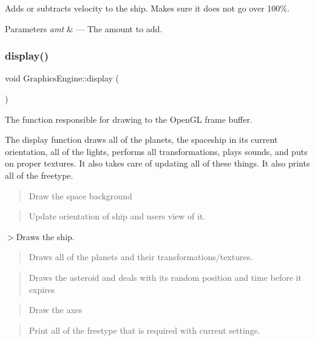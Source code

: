 Adds or subtracts velocity to the ship. Makes sure it does not go over 100\%. 


\begin{DoxyParams}{Parameters}
{\em amt} & --- The amount to add. \\
\hline
\end{DoxyParams}
\mbox{\label{class_graphics_engine_a2f0bdf1a47bf9e8d4f1c9525c2ebc8f9}} 
\subsubsection{\texorpdfstring{display()}{display()}}
{\footnotesize\ttfamily void Graphics\+Engine\+::display (\begin{DoxyParamCaption}{ }\end{DoxyParamCaption})}



The function responsible for drawing to the Open\+GL frame buffer. 

The display function draws all of the planets, the spaceship in it\textquotesingle{}s current orientation, all of the lights, performs all transformations, plays sounds, and puts on proper textures. It also takes care of updating all of these things. It also prints all of the freetype. \begin{quote}
Draw the space background \end{quote}


\begin{quote}
Update orientation of ship and user\textquotesingle{}s view of it. \end{quote}


$>$Draws the ship.

\begin{quote}
Draws all of the planets and their transformations/textures. \end{quote}


\begin{quote}
Draws the asteroid and deals with it\textquotesingle{}s random position and time before it expires \end{quote}


\begin{quote}
Draw the axes \end{quote}


\begin{quote}
Print all of the freetype that is required with current settings. \end{quote}
\mbox{\label{class_graphics_engine_a45375adf56d4769b0f33206dc760a1f6}} 
